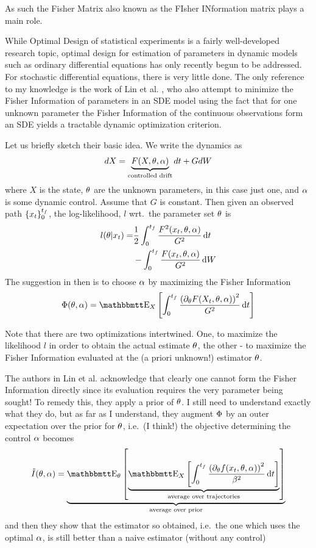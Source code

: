  

As such the Fisher Matrix also known as the FIsher INformation matrix
plays a main role. 

While Optimal Design of statistical experiments is a fairly well-developed
research topic, optimal design for estimation of parameters in dynamic models
such as ordinary differential equations has only recently begun to be addressed.
For stochastic differential equations, there is very little done. The only
reference to my knowledge is the work of Lin et al. \cite{Lin}, who also
attempt to minimize the Fisher Information of parameters in an SDE model
using the fact that for one unknown parameter the Fisher Information  of the
continuous observations form an SDE yields a tractable dynamic optimization
criterion.

Let us briefly sketch their basic idea. We write the dynamics as
\begin{equation}
dX = \underbrace{F(X,{ \theta}, \alpha)}_{\textrm{controlled drift}}dt
+ G dW
\end{equation}
where $X$ is the state, ${ \theta}$ are the unknown parameters, in this case just one,
and $\alpha$ is some dynamic control. Assume that $G$ is constant. Then given an
observed path $\{x_t\}_0^{ t_f }$, the log-likelihood, $l$ wrt.\ the parameter set ${ \theta}$ is
\begin{align}
l({ \theta} | x_t) =&  \frac 12 \int_0^{ t_f } \frac{F^2(x_t,{ \theta}, \alpha)}{G^2} \, \mathrm{d} t
\notag
\\
&- \int_0^{ t_f }  \frac{F(x_t,{ \theta}, \alpha)}{G^2} \, \mathrm{d} W
\label{eq:log_likelihood_cts_time}
\end{align}
The suggestion in \cite{Lin} then is to choose $\alpha$ by maximizing the Fisher Information
\begin{equation}
\FI(\th, \a) = \Exp_X \left[ \int_0^\tf \frac{ \left( \di_\th F(X_t,\th, \a)
\right)^2}{G^2}
\intd{t}
\right]
\label{eq:Fisher_Information}
\end{equation}

Note that there are two optimizations intertwined. One, to maximize
the likelihood $l$ in order to obtain the actual estimate ${ \theta}$, the other - to
maximize the Fisher Information evaluated at the (a priori unknown!) estimator ${ \theta}$.

The authors in Lin et al. \cite{Lin} acknowledge that clearly one cannot form
the Fisher Information directly since its evaluation requires the very parameter
being sought! To remedy this, they apply a prior of ${ \theta}$. I still need to
understand exactly what they do, but as far as I understand, they augment ${\Phi}$
by an outer expectation over the prior for ${ \theta}$, i.e.\ (I think!) the objective
determining the control $\alpha$ becomes
\begin{equation}
\tilde{I}(\th, \a) = \underbrace{\Exp_\th \left [
\underbrace{\Exp_{X} \left[ \int_0^\tf
\frac{ \left( \di_\th f(x_t,\th, \a) \right)^2}{\b^2}
\intd{t}
\right]}_{\textrm{average over trajectories}}
\right]}_{\textrm{average over prior}}
\label{eq:Fisher_Information}
\end{equation}
and then they show that the estimator so obtained, i.e.\ the one which uses the
optimal $\alpha$, is still better than a naive estimator (without any control)
   


